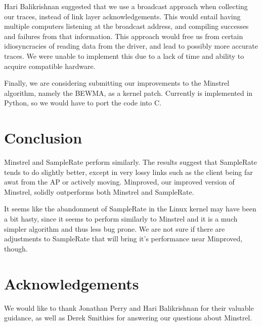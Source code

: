 \documentclass[letterpaper,twocolumn,10pt]{article}
\begin{document}
Hari Balikrishnan suggested that we use a broadcast approach when collecting our traces, instead of link layer acknowledgements. This would entail having multiple computers listening at the broadcast address, and compiling successes and failures from that information. This approach would free us from certain idiosyncracies of reading data from the driver, and lead to possibly more accurate traces. We were unable to implement this due to a lack of time and ability to acquire compatible hardware.

Finally, we are considering submitting our improvements to the Minstrel algorithm, namely the BEWMA, as a kernel patch. Currently is implemented in Python, so we would have to port the code into C.

\section{Conclusion}

Minstrel and SampleRate perform similarly. The results suggest that SampleRate tends to do slightly better, except in very lossy links such as the client being far awat from the AP or actively moving. Minproved, our improved version of Minstrel, solidly outperforms both Minstrel and SampleRate. 

It seems like the abandonment of SampleRate in the Linux kernel may have been a bit hasty, since it seems to perform similarly to Minstrel and it is a much simpler algorithm and thus less bug prone. We are not sure if there are adjustments to SampleRate that will bring it's performance near Minproved, though. 

\section{Acknowledgements}
We would like to thank Jonathan Perry and Hari Balikrishnan for their valuable guidance, as well as Derek Smithies for answering our questions about Minstrel. 


{\footnotesize 
}
\end{document}
